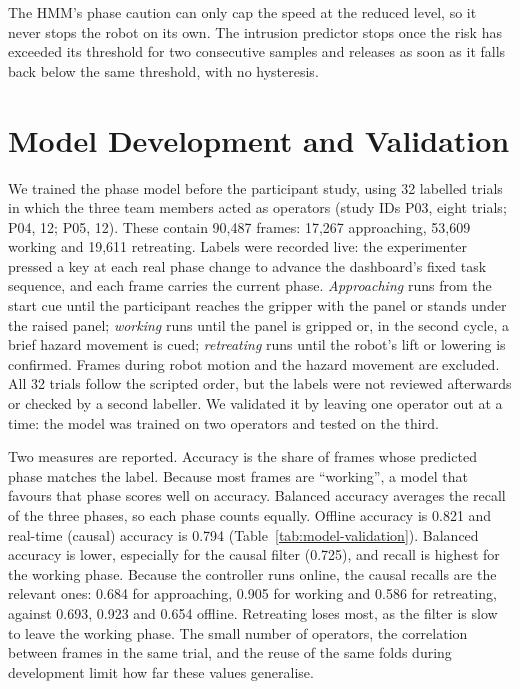 \documentclass{IEEEtran}
\newcommand{\aidraft}[1]{#1}
\begin{document}
\aidraft{The HMM's phase caution can only cap the speed at the reduced level, so
it never stops the robot on its own. The intrusion predictor stops once the
risk has exceeded its threshold for two consecutive samples and releases as
soon as it falls back below the same threshold, with no hysteresis.}

\section{Model Development and Validation}
We trained the phase model before the participant study, using 32 labelled
trials in which the three team members acted as operators (study IDs P03,
eight trials; P04, 12; P05, 12). These contain 90,487 frames: 17,267
approaching, 53,609 working and 19,611 retreating. Labels were recorded live:
the experimenter pressed a key at each real phase change to advance the
dashboard's fixed task sequence, and each frame carries the current phase.
\emph{Approaching} runs from the start cue until the participant reaches the
gripper with the panel or stands under the raised panel; \emph{working} runs
until the panel is gripped or, in the second cycle, a brief hazard movement is
cued; \emph{retreating} runs until the robot's lift or lowering is confirmed.
Frames during robot motion and the hazard movement are excluded. All 32 trials
follow the scripted order, but the labels were not reviewed afterwards or
checked by a second labeller. We validated it by leaving
one operator out at a time: the model was trained on two operators and tested
on the third.

Two measures are reported. Accuracy is the share of frames whose predicted
phase matches the label. Because most frames are ``working'', a model that
favours that phase scores well on accuracy. Balanced accuracy averages the
recall of the three phases, so each phase counts equally. Offline accuracy is
0.821 and real-time (causal) accuracy is 0.794 (Table~\ref{tab:model-validation}).
Balanced accuracy is lower, especially for the causal filter (0.725), and recall
is highest for the working phase. Because the controller runs online, the
causal recalls are the relevant ones: 0.684 for approaching, 0.905 for working
and 0.586 for retreating, against 0.693, 0.923 and 0.654 offline. Retreating
loses most, as the filter is slow to leave the working phase. The small number of operators, the
correlation between frames in the same trial, and the reuse of the same folds
during development limit how far these values generalise.
\end{document}
